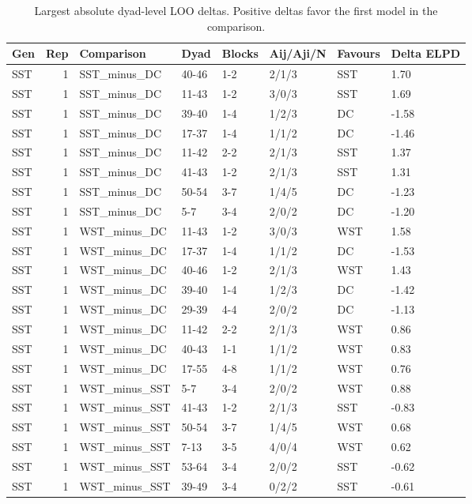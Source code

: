 \begin{table}[!h]
\centering
\caption{Largest absolute dyad-level LOO deltas. Positive deltas favor the first model in the comparison.}
\centering
\begin{tabular}[t]{lrllllll}
\toprule
Gen & Rep & Comparison & Dyad & Blocks & Aij/Aji/N & Favours & Delta ELPD\\
\midrule
SST & 1 & SST_minus_DC & 40-46 & 1-2 & 2/1/3 & SST & 1.70\\
SST & 1 & SST_minus_DC & 11-43 & 1-2 & 3/0/3 & SST & 1.69\\
SST & 1 & SST_minus_DC & 39-40 & 1-4 & 1/2/3 & DC & -1.58\\
SST & 1 & SST_minus_DC & 17-37 & 1-4 & 1/1/2 & DC & -1.46\\
SST & 1 & SST_minus_DC & 11-42 & 2-2 & 2/1/3 & SST & 1.37\\
\addlinespace
SST & 1 & SST_minus_DC & 41-43 & 1-2 & 2/1/3 & SST & 1.31\\
SST & 1 & SST_minus_DC & 50-54 & 3-7 & 1/4/5 & DC & -1.23\\
SST & 1 & SST_minus_DC & 5-7 & 3-4 & 2/0/2 & DC & -1.20\\
SST & 1 & WST_minus_DC & 11-43 & 1-2 & 3/0/3 & WST & 1.58\\
SST & 1 & WST_minus_DC & 17-37 & 1-4 & 1/1/2 & DC & -1.53\\
\addlinespace
SST & 1 & WST_minus_DC & 40-46 & 1-2 & 2/1/3 & WST & 1.43\\
SST & 1 & WST_minus_DC & 39-40 & 1-4 & 1/2/3 & DC & -1.42\\
SST & 1 & WST_minus_DC & 29-39 & 4-4 & 2/0/2 & DC & -1.13\\
SST & 1 & WST_minus_DC & 11-42 & 2-2 & 2/1/3 & WST & 0.86\\
SST & 1 & WST_minus_DC & 40-43 & 1-1 & 1/1/2 & WST & 0.83\\
\addlinespace
SST & 1 & WST_minus_DC & 17-55 & 4-8 & 1/1/2 & WST & 0.76\\
SST & 1 & WST_minus_SST & 5-7 & 3-4 & 2/0/2 & WST & 0.88\\
SST & 1 & WST_minus_SST & 41-43 & 1-2 & 2/1/3 & SST & -0.83\\
SST & 1 & WST_minus_SST & 50-54 & 3-7 & 1/4/5 & WST & 0.68\\
SST & 1 & WST_minus_SST & 7-13 & 3-5 & 4/0/4 & WST & 0.62\\
\addlinespace
SST & 1 & WST_minus_SST & 53-64 & 3-4 & 2/0/2 & SST & -0.62\\
SST & 1 & WST_minus_SST & 39-49 & 3-4 & 0/2/2 & SST & -0.61\\

\end{tabular}
\end{table}
